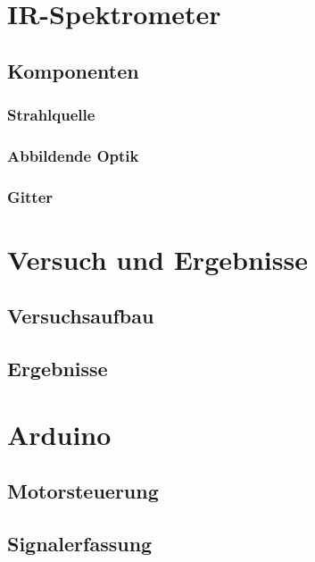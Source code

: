\documentclass{article}
\begin{document}

\section{IR-Spektrometer}


\subsection{Komponenten}

\subsubsection{Strahlquelle}


\subsubsection{Abbildende Optik}


\subsubsection{Gitter}


\section{Versuch und Ergebnisse}


\subsection{Versuchsaufbau}


\subsection{Ergebnisse}


\section{Arduino} %

\subsection{Motorsteuerung}

\subsection{Signalerfassung}
\end{document}
